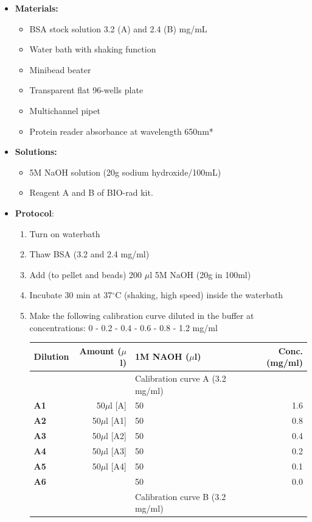 \documentclass{EU-report}
\begin{document}
\begin{itemize}
\item \textbf{Materials:}
\begin{itemize} 
\item BSA stock solution 3.2 (A) and 2.4 (B) mg/mL
\item Water bath with shaking function
\item Minibead beater
\item Transparent flat 96-wells plate
\item Multichannel pipet
\item Protein reader absorbance at wavelength 650nm*
\end{itemize}
\item \textbf{Solutions:}
\begin{itemize}
\item 5M NaOH solution (20g sodium hydroxide/100mL)
\item Reagent A and B of BIO-rad kit.
\end{itemize}
\item\textbf{Protocol}:
\begin{enumerate}
\item Turn on waterbath 
\item Thaw BSA (3.2 and 2.4 mg/ml)
\item Add (to pellet and beads) 200 $\mu$l 5M NaOH (20g in 100ml)
\item Incubate 30 min at 37$^{\circ}$C (shaking, high speed) inside the waterbath
\item Make the following calibration curve diluted in the buffer at concentrations: 0 - 0.2 - 0.4 - 0.6 - 0.8 - 1.2 mg/ml
\begin{center}
	\begin{tabular}{lrp{7cm}r} \hline\hline
\textbf{Dilution} & \textbf{Amount (\boldmath$\mu$l)} 	 & \textbf{ 1M NAOH (\boldmath$\mu$l)} & \textbf{ Conc. (mg/ml)} \\
\hline
 \textbf{}	               &                                              & Calibration curve A (3.2 mg/ml) 					                        & \\
 \hline
 \textbf{A1}	 	& 50$\mu$l [A]	                                        & 50							& 1.6\\
 \hline
 \textbf{A2}	 	& 50$\mu$l [A1]			              & 50						        & 0.8\\
 \hline
 \textbf{A3}	 	& 50$\mu$l [A2]			 	      & 50						       & 0.4\\
 \hline
 \textbf{A4}	       &  50$\mu$l [A3]			   	              & 50						       & 0.2\\
 \hline
 \textbf{A5}	       & 50$\mu$l [A4]	                                       & 50					               & 0.1\\
 \hline
 \textbf{A6}	       &                                                               & 50					               & 0.0\\
 \hline
 \textbf{}	               &                                               & Calibration curve B (3.2 mg/ml)					                        & \\
 \hline


\end{tabular}
\end{center}
\end{enumerate}
\end{itemize}
\end{document}
